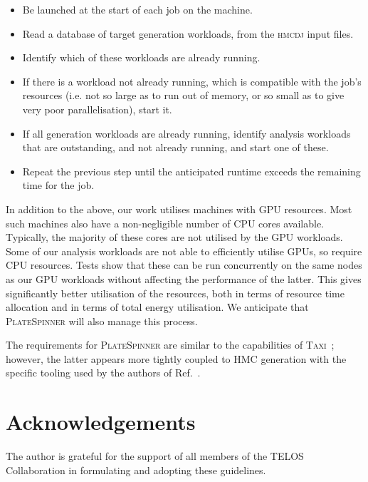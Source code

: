 \documentclass{article}
\newcommand\program[1]{\textsc{#1}\xspace}
\begin{document}
\begin{itemize}
  \item
        Be launched at the start of each job on the machine.
  \item
        Read a database of target generation workloads,
        from the \program{hmcdj} input files.
  \item
        Identify which of these workloads are already running.
  \item
        If there is a workload not already running,
        which is compatible with the job's resources
        (i.e. not so large as to run out of memory,
        or so small as to give very poor parallelisation),
        start it.
  \item
        If all generation workloads are already running,
        identify analysis workloads that are outstanding,
        and not already running,
        and start one of these.
  \item
        Repeat the previous step until
        the anticipated runtime exceeds the remaining time for the job.
\end{itemize}

In addition to the above,
our work utilises machines with GPU resources.
Most such machines also have a non-negligible number of CPU cores available.
Typically,
the majority of these cores are not utilised by the GPU workloads.
Some of our analysis workloads are not able to efficiently utilise GPUs,
so require CPU resources.
Tests show that these can be run concurrently on the same nodes as our GPU workloads
without affecting the performance of the latter.
This gives significantly better utilisation of the resources,
both in terms of resource time allocation
and in terms of total energy utilisation.
We anticipate that \program{PlateSpinner} will also manage this process.

The requirements for \program{PlateSpinner} are similar to the capabilities of \program{Taxi}~\cite{Ayyar:2018wwf};
however,
the latter appears more tightly coupled to HMC generation with
the specific tooling used by the authors of Ref.~\cite{Ayyar:2018wwf}.


\section{Acknowledgements}

The author is grateful for the support of all members of the TELOS Collaboration
in formulating and adopting these guidelines.
\end{document}
